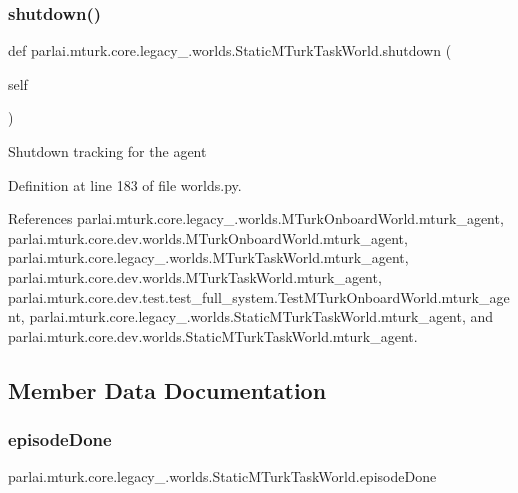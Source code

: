 \subsubsection{\texorpdfstring{shutdown()}{shutdown()}}
{\footnotesize\ttfamily def parlai.\+mturk.\+core.\+legacy\+\_.\+worlds.\+Static\+M\+Turk\+Task\+World.\+shutdown (\begin{DoxyParamCaption}\item[{}]{self }\end{DoxyParamCaption})}

\begin{DoxyVerb}Shutdown tracking for the agent\end{DoxyVerb}
 

Definition at line 183 of file worlds.\+py.



References parlai.\+mturk.\+core.\+legacy\+\_.\+worlds.\+M\+Turk\+Onboard\+World.\+mturk\+\_\+agent, parlai.\+mturk.\+core.\+dev.\+worlds.\+M\+Turk\+Onboard\+World.\+mturk\+\_\+agent, parlai.\+mturk.\+core.\+legacy\+\_.\+worlds.\+M\+Turk\+Task\+World.\+mturk\+\_\+agent, parlai.\+mturk.\+core.\+dev.\+worlds.\+M\+Turk\+Task\+World.\+mturk\+\_\+agent, parlai.\+mturk.\+core.\+dev.\+test.\+test\+\_\+full\+\_\+system.\+Test\+M\+Turk\+Onboard\+World.\+mturk\+\_\+agent, parlai.\+mturk.\+core.\+legacy\+\_.\+worlds.\+Static\+M\+Turk\+Task\+World.\+mturk\+\_\+agent, and parlai.\+mturk.\+core.\+dev.\+worlds.\+Static\+M\+Turk\+Task\+World.\+mturk\+\_\+agent.



\subsection{Member Data Documentation}
\mbox{\label{classparlai_1_1mturk_1_1core_1_1legacy__2018_1_1worlds_1_1StaticMTurkTaskWorld_a2b173491e6af4ec163df49695ad438b7}} 
\subsubsection{\texorpdfstring{episode\+Done}{episodeDone}}
{\footnotesize\ttfamily parlai.\+mturk.\+core.\+legacy\+\_.\+worlds.\+Static\+M\+Turk\+Task\+World.\+episode\+Done}



